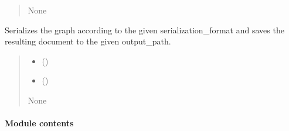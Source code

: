 \documentclass[letterpaper,10pt,english]{sphinxmanual}
\begin{document}
\begin{fulllineitems}
\begin{fulllineitems}
\begin{quote}
\begin{description}
\begin{itemize}
\end{itemize}

\sphinxAtStartPar
None

\end{description}\end{quote}

\end{fulllineitems}


\begin{fulllineitems}
\label{\detokenize{medextractor.rdf:medextractor.rdf.graphmanager.GraphManager.get_serialized_graph}}
\pysigstartsignatures
{}
\pysigstopsignatures
\sphinxAtStartPar
Serializes the graph according to the given serialization\_format and
saves the resulting document to the given output\_path.
\begin{quote}\begin{description}
\begin{itemize}
\item {} 
\sphinxAtStartPar
{} () \textendash{} 

\item {} 
\sphinxAtStartPar
{} () \textendash{} 

\end{itemize}

\sphinxAtStartPar
None

\end{description}\end{quote}

\end{fulllineitems}


\end{fulllineitems}



\paragraph{Module contents}
\label{\detokenize{medextractor.rdf:module-medextractor.rdf}}\label{\detokenize{medextractor.rdf:module-contents}}
\end{document}
